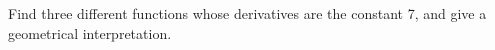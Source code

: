 Find three different functions whose derivatives are the constant 7, and give a geometrical
interpretation.
